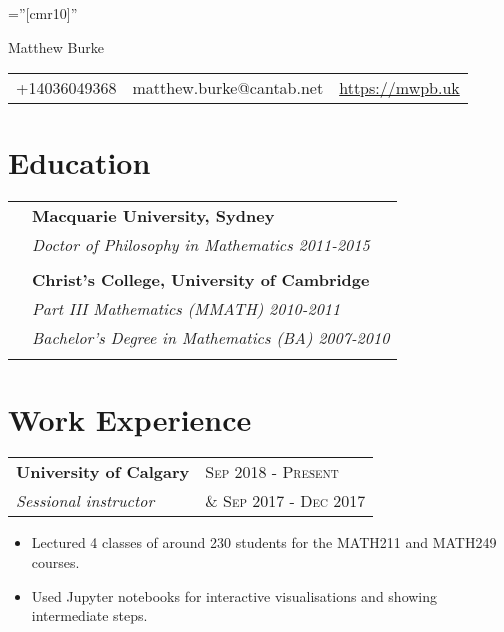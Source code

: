 \documentclass[a4paper,10pt]{article}
\begin{document}
\pagestyle{empty} %

\font\fb=''[cmr10]'' %

\par{\centering
  {\Huge {\sc Matthew Burke}
  }\bigskip\par}

\begin{tabu}{X[1 r]|X[1 c]|X[1 l]}
  +14036049368  & matthew.burke@cantab.net & \url{https://mwpb.uk}
\end{tabu}

\section{Education}

\begin{tabular}{rl}	
  & \textbf{Macquarie University, Sydney}\\
                     & \textit{Doctor of Philosophy in Mathematics 2011-2015}\\
                     &\\
  & \textbf{Christ's College, University of Cambridge}\\
                     & \textit{Part III Mathematics (MMATH) 2010-2011}\\
                     & \textit{Bachelor's Degree in Mathematics (BA) 2007-2010}\\
                     &\\
\end{tabular}

\section{Work Experience}

\begin{tabu}{X[1, l]X[1 r]}
{\bf University of Calgary}&\textsc{Sep 2018 - Present}\\
\emph{Sessional instructor}&\textsc{\& Sep 2017 - Dec 2017}
\end{tabu}
\begin{itemize}
  \item Lectured 4 classes of around 230 students for the MATH211 and MATH249 courses.
  \item Used Jupyter notebooks for interactive visualisations and showing intermediate steps.
\end{itemize}
\end{document}
